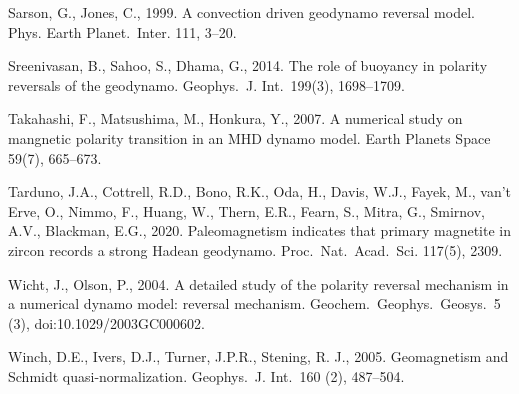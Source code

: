 \begin{list}
%
\item
Sarson, G., Jones, C., 1999. A convection driven geodynamo reversal model. Phys. Earth Planet.\ Inter. 111, 3--20.
%
\item
Sreenivasan, B., Sahoo, S., Dhama, G., 2014. The role of buoyancy in polarity reversals of the geodynamo. Geophys.\ J. Int.\ 199(3), 1698--1709.
%
\item
Takahashi, F., Matsushima, M., Honkura, Y., 2007. A numerical study on mangnetic polarity transition in an MHD dynamo model. Earth Planets Space 59(7), 665--673.
%
\item
Tarduno, J.A., Cottrell, R.D., Bono, R.K., Oda, H., Davis, W.J., Fayek, M., van't Erve, O., Nimmo, F., Huang, W., Thern, E.R., Fearn, S., Mitra, G., Smirnov, A.V., Blackman, E.G., 2020. Paleomagnetism indicates that primary magnetite in zircon records a strong Hadean geodynamo. Proc.\ Nat.\ Acad.\ Sci. 117(5), 2309.
%
\item
Wicht, J., Olson, P., 2004. A detailed study of the polarity reversal mechanism in a numerical dynamo model: reversal mechanism. Geochem.\ Geophys.\ Geosys.\ 5 (3), doi:10.1029/2003GC000602.
%
\item
Winch, D.E., Ivers, D.J., Turner, J.P.R., Stening, R. J., 2005. Geomagnetism and Schmidt quasi-normalization. Geophys.\ J. Int.\ 160 (2), 487--504.
%
\end{list}